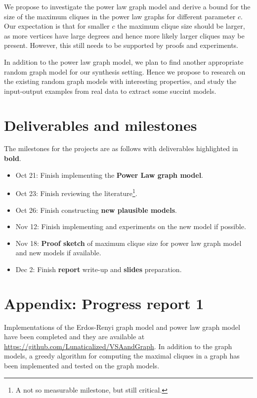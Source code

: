 \documentclass{article}
\begin{document}
We propose to investigate the power law graph model and derive a bound for the size of the maximum cliques in the power law graphs for different parameter $c$. Our expectation is that for smaller $c$ the maximum clique size should be larger, as more vertices have large degrees and hence more likely larger cliques may be present. However, this still needs to be supported by proofs and experiments.

In addition to the power law graph model, we plan to find another appropriate random graph model for our synthesis setting. Hence we propose to research on the existing random graph models with interesting properties\cite{easley2010networks}, and study the input-output examples from real data to extract some succint models.


\section{Deliverables and milestones}
The milestones for the projects are as follows with deliverables highlighted in \textbf{bold}.
\begin{itemize}
	\item Oct 21: Finish implementing the \textbf{Power Law graph model}.
	\item Oct 23: Finish reviewing the literature\footnote{A not so measurable milestone, but still critical.}.
	\item Oct 26: Finish constructing \textbf{new plausible models}.
	\item Nov 12: Finish implementing and experiments on the new model if possible.
	\item Nov 18: \textbf{Proof sketch} of maximum clique size for power law graph model and new models if available.
	\item Dec 2: Finish \textbf{report} write-up and \textbf{slides} preparation.
\end{itemize}



{}



\newpage
\section*{Appendix: Progress report 1}



Implementations of the Erdos-Renyi graph model and power law graph model have been completed and they are available at \url{https://github.com/Lunaticalized/VSAandGraph}. In addition to the graph models, a greedy algorithm for computing the maximal cliques in a graph has been implemented and tested on the graph models. 
\end{document}

